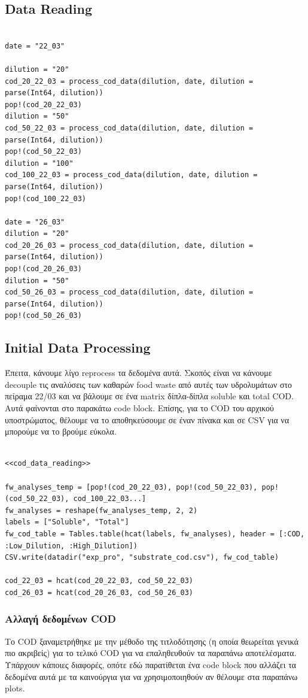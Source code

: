 \documentclass[11pt]{article}
\begin{document}
\subsection{Data Reading}
\label{sec:org175516d}
\begin{verbatim}

date = "22_03"

dilution = "20"
cod_20_22_03 = process_cod_data(dilution, date, dilution = parse(Int64, dilution))
pop!(cod_20_22_03)
dilution = "50"
cod_50_22_03 = process_cod_data(dilution, date, dilution = parse(Int64, dilution))
pop!(cod_50_22_03)
dilution = "100"
cod_100_22_03 = process_cod_data(dilution, date, dilution = parse(Int64, dilution))
pop!(cod_100_22_03)

date = "26_03"
dilution = "20"
cod_20_26_03 = process_cod_data(dilution, date, dilution = parse(Int64, dilution))
pop!(cod_20_26_03)
dilution = "50"
cod_50_26_03 = process_cod_data(dilution, date, dilution = parse(Int64, dilution))
pop!(cod_50_26_03)
\end{verbatim}

\subsection{Initial Data Processing}
\label{sec:orga800c94}
Έπειτα, κάνουμε λίγο reprocess τα δεδομένα αυτά. Σκοπός είναι να κάνουμε decouple τις αναλύσεις των καθαρών food waste από αυτές των υδρολυμάτων στο πείραμα 22/03 και να βάλουμε σε ένα matrix δίπλα-δίπλα soluble και total COD. Αυτά φαίνονται στο παρακάτω code block. Επίσης, για το COD του αρχικού υποστρώματος, θέλουμε να το αποθηκεύσουμε σε έναν πίνακα και σε CSV για να μπορούμε να το βρούμε εύκολα.

\begin{verbatim}

<<cod_data_reading>>

fw_analyses_temp = [pop!(cod_20_22_03), pop!(cod_50_22_03), pop!(cod_50_22_03), cod_100_22_03...]
fw_analyses = reshape(fw_analyses_temp, 2, 2)
labels = ["Soluble", "Total"]
fw_cod_table = Tables.table(hcat(labels, fw_analyses), header = [:COD, :Low_Dilution, :High_Dilution])
CSV.write(datadir("exp_pro", "substrate_cod.csv"), fw_cod_table)

cod_22_03 = hcat(cod_20_22_03, cod_50_22_03)
cod_26_03 = hcat(cod_20_26_03, cod_50_26_03)
\end{verbatim}

\subsubsection{Αλλαγή δεδομένων COD}
\label{sec:org2944815}
Το COD ξαναμετρήθηκε με την μέθοδο της τιτλοδότησης (η οποία θεωρείται γενικά πιο ακριβείς) για το τελικό COD για να επαληθευθούν τα παραπάνω αποτελέσματα. Υπάρχουν κάποιες διαφορές, οπότε εδώ παρατίθεται ένα code block που αλλάζει τα δεδομένα αυτά με τα καινούργια για να χρησιμοποιηθούν αν θέλουμε στα παραπάνω plots.
\end{document}
